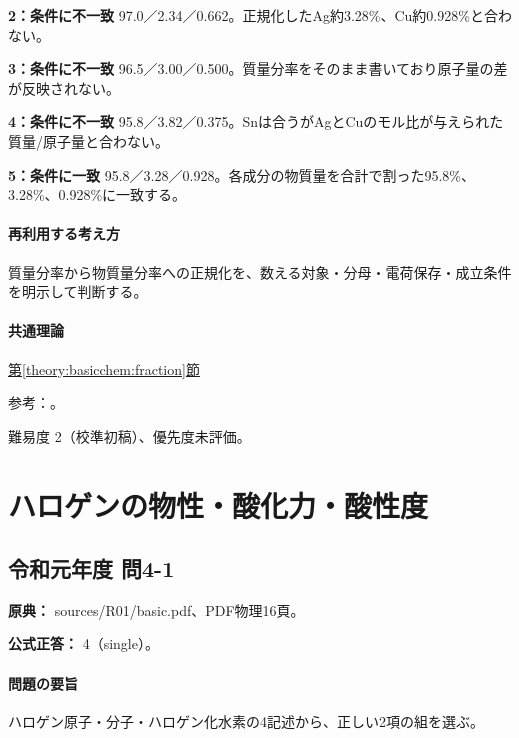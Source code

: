 \noindent\textbf{2：条件に不一致} 97.0／2.34／0.662。正規化したAg約3.28\%、Cu約0.928\%と合わない。\par

\noindent\textbf{3：条件に不一致} 96.5／3.00／0.500。質量分率をそのまま書いており原子量の差が反映されない。\par

\noindent\textbf{4：条件に不一致} 95.8／3.82／0.375。Snは合うがAgとCuのモル比が与えられた質量/原子量と合わない。\par

\noindent\textbf{5：条件に一致} 95.8／3.28／0.928。各成分の物質量を合計で割った95.8\%、3.28\%、0.928\%に一致する。\par

\paragraph{再利用する考え方} 質量分率から物質量分率への正規化を、数える対象・分母・電荷保存・成立条件を明示して判断する。

\paragraph{共通理論} \hyperref[theory:basicchem:fraction]{第\ref*{theory:basicchem:fraction}節}

\par 参考：\cite{iupac_amount_fraction}。

\par 難易度 2（校準初稿）、優先度未評価。

\section{ハロゲンの物性・酸化力・酸性度}

\subsection{令和元年度 問4-1}
\label{q:r01-reg-basic-4-1}

\noindent\textbf{原典：} sources/R01/basic.pdf、PDF物理16頁。

\textbf{公式正答：} 4（single）。

\paragraph{問題の要旨} ハロゲン原子・分子・ハロゲン化水素の4記述から、正しい2項の組を選ぶ。

